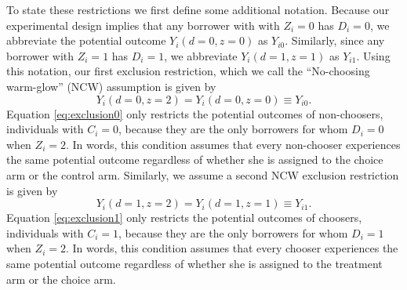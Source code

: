 \documentclass[12pt, a4paper]{article}
\begin{document}
To state these restrictions we first define some additional notation.
Because our experimental design implies that any borrower with with $Z_i = 0$ has $D_i = 0$, we abbreviate the potential outcome $Y_i(d=0,z=0)$ as $Y_{i0}$. 
Similarly, since any borrower with $Z_i = 1$ has $D_i = 1$, we abbreviate $Y_i(d=1,z=1)$ as $Y_{i1}$. 
Using this notation, our first exclusion restriction, which we call the ``No-choosing warm-glow'' (NCW) assumption is given by
\begin{equation}
Y_i(d=0,z=2) = Y_i(d=0,z=0) \equiv Y_{i0}.
\label{eq:exclusion0}
\end{equation}
Equation \ref{eq:exclusion0} only restricts the potential outcomes of non-choosers,  individuals with $C_i = 0$, because they are the only borrowers for whom $D_i = 0$ when $Z_i = 2$.
In words, this condition assumes that every non-chooser experiences the same potential outcome regardless of whether she is assigned to the choice arm or the control arm.
Similarly, we assume a second NCW exclusion restriction is given by
\begin{equation}
Y_i(d=1,z=2) = Y_i(d=1,z=1)\equiv Y_{i1}.
\label{eq:exclusion1}
\end{equation}
Equation \ref{eq:exclusion1} only restricts the potential outcomes of choosers, individuals with $C_i =1$, because they are the only borrowers for whom $D_i = 1$ when $Z_i = 2$.
In words, this condition assumes that every chooser experiences the same potential outcome regardless of whether she is assigned to the treatment arm or the choice arm. 
\end{document}
